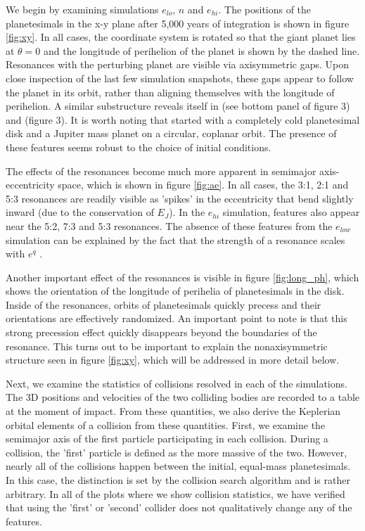 \documentclass[onecolumn]{aastex63}
\begin{document}
We begin by examining simulations $e_{lo}$, $n$ and $e_{hi}$. The positions of the planetesimals in the x-y plane after 5,000 years of integration is shown in figure \ref{fig:xy}. In all cases, the coordinate system is rotated so that the giant planet lies at $\theta = 0$ and the longitude of perihelion of the planet is shown by the dashed line. Resonances with the perturbing planet are visible via axisymmetric gaps. Upon close inspection of the last few simulation snapshots, these gaps appear to follow the planet in its orbit, rather than aligning themselves with the longitude of perihelion. A similar substructure reveals itself in \citet{2000Icar..143...45R} (see bottom panel of figure 3) and \citet{2016ApJ...818..159T} (figure 3). It is worth noting that \citet{2000Icar..143...45R} started with a completely cold planetesimal disk and a Jupiter mass planet on a circular, coplanar orbit. The presence of these features seems robust to the choice of initial conditions.

The effects of the resonances become much more apparent in semimajor axis-eccentricity space, which is shown in figure \ref{fig:ae}. In all cases, the 3:1, 2:1 and 5:3 resonances are readily visible as 'spikes' in the eccentricity that bend slightly inward (due to the conservation of $E_{J}$). In the $e_{hi}$ simulation, features also appear near the 5:2, 7:3 and 5:3 resonances. The absence of these features from the $e_{low}$ simulation can be explained by the fact that the strength of a resonance scales with $e^{q}$ \citep{1994PhyD...77..289M}.

Another important effect of the resonances is visible in figure \ref{fig:long_ph}, which shows the orientation of the longitude of perihelia of planetesimals in the disk. Inside of the resonances, orbits of planetesimals quickly precess and their orientations are effectively randomized. An important point to note is that this strong precession effect quickly disappears beyond the boundaries of the resonance. This turns out to be important to explain the nonaxisymmetric structure seen in figure \ref{fig:xy}, which will be addressed in more detail below.

Next, we examine the statistics of collisions resolved in each of the simulations. The 3D positions and velocities of the two colliding bodies are recorded to a table at the moment of impact. From these quantities, we also derive the Keplerian orbital elements of a collision from these quantities. First, we examine the semimajor axis of the first particle participating in each collision. During a collision, the 'first' particle is defined as the more massive of the two. However, nearly all of the collisions happen between the initial, equal-mass planetesimals. In this case, the distinction is set by the collision search algorithm and is rather arbitrary. In all of the plots where we show collision statistics, we have verified that using the 'first' or 'second' collider does not qualitatively change any of the features.
\end{document}
